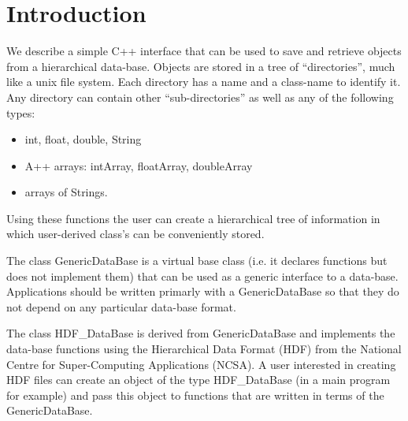 \documentclass{article}
\begin{document}
\vfill\eject
\tableofcontents






\section{Introduction}


We describe a simple C++ interface that can be used to save and retrieve objects
from a hierarchical data-base. Objects are stored in a tree of ``directories'',
much like a unix file system.
Each directory has a name and a class-name to identify it. Any directory can
contain other ``sub-directories'' as well as any of the following types:
\begin{itemize}
  \item int, float, double, String
  \item A++ arrays: intArray, floatArray, doubleArray
  \item arrays of Strings.
\end{itemize}
Using these functions the user can create a hierarchical tree of information in which
user-derived class's can be conveniently stored. 

The class {\ff GenericDataBase} is a virtual base class (i.e. it declares functions
but does not implement them) that can be used as a generic interface to a data-base.
Applications should be written primarly with a {\ff GenericDataBase} so that they
do not depend on any particular data-base format.

The class {\ff HDF\_DataBase} is derived from {\ff GenericDataBase} and implements
the data-base functions using the Hierarchical Data Format (HDF) from the National Centre
for Super-Computing Applications (NCSA). A user interested in creating HDF files
can create an object of the type {\ff HDF\_DataBase} (in a main program for example) and pass
this object to functions that are written in terms of the {\ff GenericDataBase}.
\end{document}
